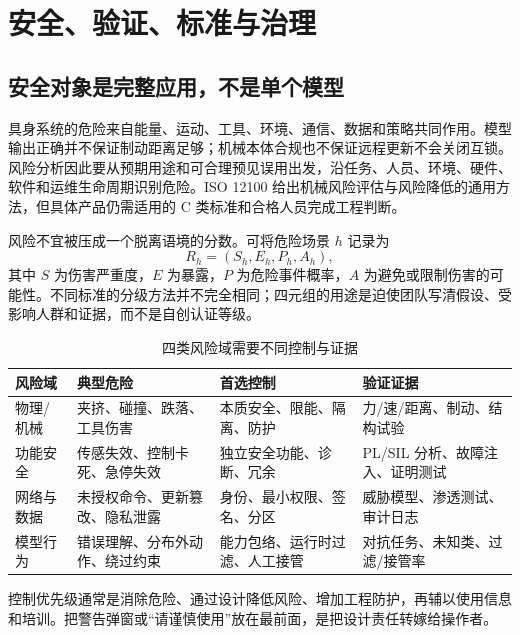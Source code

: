 \chapter{安全、验证、标准与治理}
\label{chap:safety-verification-governance}

\section{安全对象是完整应用，不是单个模型}

具身系统的危险来自能量、运动、工具、环境、通信、数据和策略共同作用。模型输出正确并不保证制动距离足够；机械本体合规也不保证远程更新不会关闭互锁。风险分析因此要从预期用途和可合理预见误用出发，沿任务、人员、环境、硬件、软件和运维生命周期识别危险。ISO 12100 给出机械风险评估与风险降低的通用方法\cite{iso12100_2010}，但具体产品仍需适用的 C 类标准和合格人员完成工程判断。

风险不宜被压成一个脱离语境的分数。可将危险场景 $h$ 记录为
\begin{equation}
R_h=(S_h,E_h,P_h,A_h),
\label{eq:risk-tuple}
\end{equation}
其中 $S$ 为伤害严重度，$E$ 为暴露，$P$ 为危险事件概率，$A$ 为避免或限制伤害的可能性。不同标准的分级方法并不完全相同；四元组的用途是迫使团队写清假设、受影响人群和证据，而不是自创认证等级。

\begin{table}[H]
\begingroup
{}
\centering
\caption{四类风险域需要不同控制与证据}
\label{tab:safety-domains}
\begin{tabularx}{\textwidth}{p{}YYY}
\toprule
风险域 & 典型危险 & 首选控制 & 验证证据 \\
\midrule
物理/机械 & 夹挤、碰撞、跌落、工具伤害 & 本质安全、限能、隔离、防护 & 力/速/距离、制动、结构试验 \\
功能安全 & 传感失效、控制卡死、急停失效 & 独立安全功能、诊断、冗余 & PL/SIL 分析、故障注入、证明测试 \\
网络与数据 & 未授权命令、更新篡改、隐私泄露 & 身份、最小权限、签名、分区 & 威胁模型、渗透测试、审计日志 \\
模型行为 & 错误理解、分布外动作、绕过约束 & 能力包络、运行时过滤、人工接管 & 对抗任务、未知类、过滤/接管率 \\
\bottomrule
\end{tabularx}
\endgroup
\end{table}

控制优先级通常是消除危险、通过设计降低风险、增加工程防护，再辅以使用信息和培训。把警告弹窗或“请谨慎使用”放在最前面，是把设计责任转嫁给操作者。


